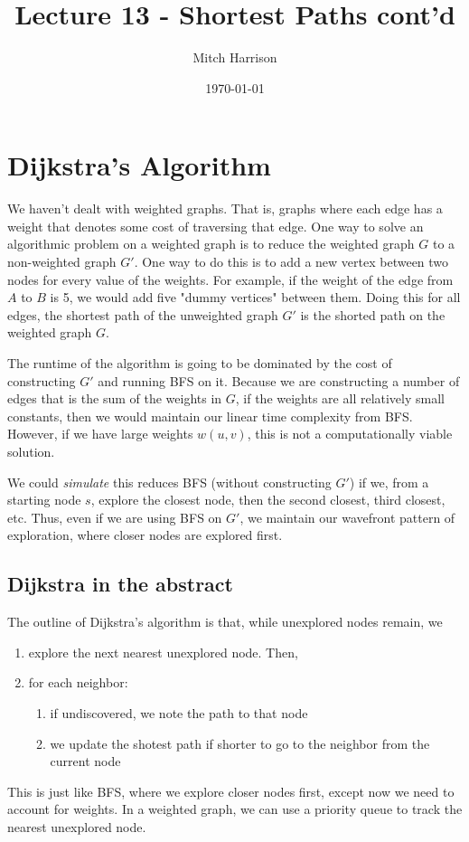 \documentclass[titlepage, 12pt, leqno]{article}
\title{\Huge{Lecture 13 - Shortest Paths cont'd}}
\author{\large{Mitch Harrison}}
\date{\today}
\begin{document}
\setlength{\parskip}{1\baselineskip}
\setlength{\parindent}{15pt}
\maketitle
\tableofcontents
\newpage


\section{Dijkstra's Algorithm}

We haven't dealt with weighted graphs. That is, graphs where each edge has
a weight that denotes some cost of traversing that edge. One way to solve an
algorithmic problem on a weighted graph is to reduce the weighted graph $G$
to a non-weighted graph $G'$. One way to do this is to add a new vertex between
two nodes for every value of the weights. For example, if the weight of the
edge from $A$ to $B$ is 5, we would add five "dummy vertices" between them.
Doing this for all edges, the shortest path of the unweighted graph $G'$ is the
shorted path on the weighted graph $G$.

The runtime of the algorithm is going to be dominated by the cost of constructing
$G'$ and running BFS on it. Because we are constructing a number of edges that 
is the sum of the weights in $G$, if the weights are all relatively small
constants, then we would maintain our linear time complexity from BFS. 
However, if we have large weights $w(u,v)$, this is not a computationally viable
solution.

We could \textit{simulate} this reduces BFS (without constructing $G'$) if we,
from a starting node $s$, explore the closest node, then the second closest,
third closest, etc. Thus, even if we are using BFS on $G'$, we maintain our
wavefront pattern of exploration, where closer nodes are explored first.

\subsection{Dijkstra in the abstract}
The outline of Dijkstra's algorithm is that, while unexplored nodes remain, we
\begin{enumerate}
    \item explore the next nearest unexplored node. Then,
    \item for each neighbor:
        \begin{enumerate}
            \item if undiscovered, we note the path to that node
            \item we update the shotest path if shorter to go to the neighbor
                from the current node
        \end{enumerate}
\end{enumerate}
This is just like BFS, where we explore closer nodes first, except now we need
to account for weights. In a weighted graph, we can use a priority queue to track
the nearest unexplored node.
\end{document}
